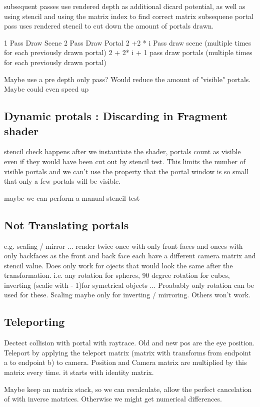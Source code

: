 subsequent passes use rendered depth as additional dicard potential, as well as using stencil and using the matrix index to find correct matrix
subsequene portal pass uses rendered stencil to cut down the amount of portals drawn. 

1 Pass Draw Scene
2 Pass Draw Portal
2 +2 * i Pass draw scene (multiple times for each previously drawn portal)
2 + 2* i + 1 pass draw portals (multiple times for each previously drawn portal)



Maybe use a pre depth only pass? Would reduce the amount of "visible" portals. Maybe could even speed up

\subsection{ Dynamic protals : Discarding in Fragment shader}
stencil check happens after we instantiate the shader, portals count as visible even if they would have been cut out by stencil test. This limits the number of visible portals and we can't use the property that the portal window is so small that only a few portals will be visible.

maybe we can perform a manual stencil test

\subsection{Not Translating portals}
e.g. scaling / mirror ...
render twice once with only front faces and onces with only backfaces as the front and back face each have a different camera matrix and stencil value.
Does only work for ojects that would look the same after the transformation. i.e. any rotation for spheres, 90 degree rotation for cubes, inverting (scalie with - 1)for symetrical objects ...
Proabably only rotation can be used for these. Scaling maybe only for inverting / mirroring. Others won't work.


\subsection{Teleporting}
Dectect collision with portal with raytrace. Old and new pos are the eye position.
Teleport by applying the teleport matrix (matrix with transforms from endpoint a to endpoint b) to camera. Position and Camera matrix are multiplied by this matrix every time. it starts with identity matrix.

Maybe keep an matrix stack, so we can recalculate, allow the perfect cancelation of with inverse matrices. Otherwise we might get numerical differences.

